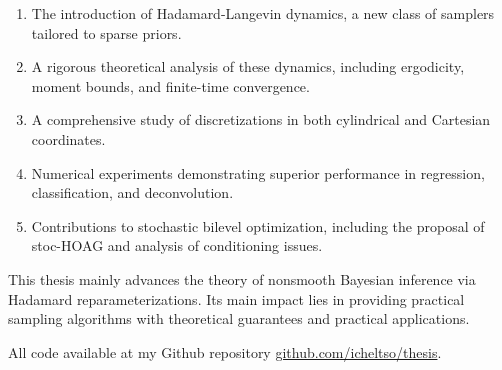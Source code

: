 \documentclass[11pt, twoside]{report}
\begin{document}
\begin{enumerate}
    \item The introduction of Hadamard-Langevin dynamics, a new class of samplers tailored to sparse priors.
    \item A rigorous theoretical analysis of these dynamics, including ergodicity, moment bounds, and finite-time convergence.
    \item A comprehensive study of discretizations in both cylindrical and Cartesian coordinates.
    \item Numerical experiments demonstrating superior performance in regression, classification, and deconvolution.
    \item Contributions to stochastic bilevel optimization, including the proposal of stoc-HOAG and analysis of conditioning issues.
\end{enumerate}

This thesis mainly advances the theory of nonsmooth Bayesian inference via Hadamard reparameterizations. Its main impact lies in providing practical sampling algorithms with theoretical guarantees and practical applications.

All code available at my Github repository \href{https://github.com/icheltso/thesis}{github.com/icheltso/thesis}.
\end{document}
